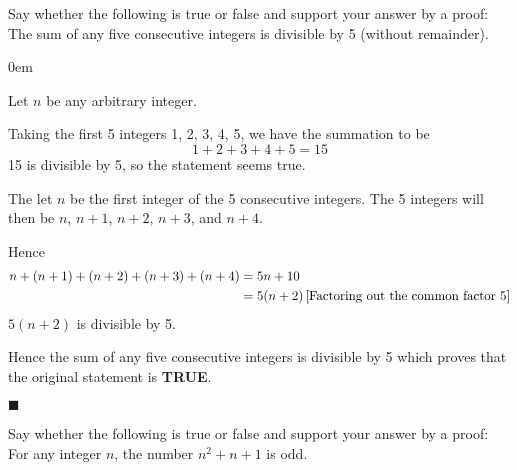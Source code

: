 \documentclass[12pt]{article}
\renewcommand{\qed}{\hfill$\blacksquare$}
\renewenvironment{proof}{\begin{addmargin}[1em]{0em}\begin{newproof}}{\end{newproof}\end{addmargin}\qed}
\newenvironment{problem}[2][Problem]{\begin{trivlist}
\item[\hskip \labelsep {\bfseries #1}\hskip \labelsep {\bfseries #2.}]}{\end{trivlist}}
\begin{document}
\pagebreak

 
\begin{problem}{2}
    Say whether the following is true or false and support your answer by a proof: The sum of any five consecutive integers is divisible by 5 (without remainder).  
\end{problem}
 
\begin{proof}[Proof]%
Let $n$ be any arbitrary integer.

Taking the first 5 integers 1, 2, 3, 4, 5, we have the summation to be
$$1+2+3+4+5=15$$
15 is divisible by 5, so the statement seems true.

The let $n$ be the first integer of the 5 consecutive integers. The 5 integers will then be $n$, $n+1$, $n+2$, $n+3$, and $n+4$.

Hence
\begin{align*}
    n + (n + 1) + (n + 2) + (n + 3) + (n + 4) &= 5n + 10 \\
    &= 5(n+2)\text{\,[Factoring out the common factor 5]}
\end{align*}
$5(n+2)$ is divisible by 5.

\hfill \break
Hence the sum of any five consecutive integers is divisible by 5 which proves that the original statement is \textbf{TRUE}.
\end{proof}

\pagebreak


\begin{problem}{3}
    Say whether the following is true or false and support your answer by a proof: For any integer $n$, the number $n^2+n+1$ is odd.
\end{problem}
\end{document}
